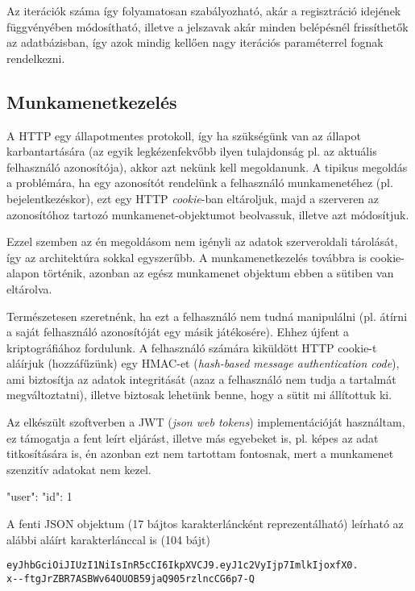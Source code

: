 Az iterációk száma így folyamatosan szabályozható, akár a regisztráció idejének
függvényében módosítható, illetve a jelszavak akár minden belépésnél
frissíthetők az adatbázisban, így azok mindig kellően nagy iterációs
paraméterrel fognak rendelkezni.

\subsection{Munkamenetkezelés}

A HTTP egy állapotmentes protokoll, így ha szükségünk van az állapot
karbantartására (az egyik legkézenfekvőbb ilyen tulajdonság pl. az aktuális
felhasználó azonosítója), akkor azt nekünk kell megoldanunk. A tipikus megoldás
a problémára, ha egy azonosítót rendelünk a felhasználó munkamenetéhez (pl.
bejelentkezéskor), ezt egy HTTP \emph{cookie}-ban eltároljuk, majd a szerveren
az azonosítóhoz tartozó munkamenet-objektumot beolvassuk, illetve azt
módosítjuk.

Ezzel szemben az én megoldásom nem igényli az adatok szerveroldali tárolását,
így az architektúra sokkal egyszerűbb. A munkamenetkezelés továbbra is
cookie-alapon történik, azonban az egész munkamenet objektum ebben a sütiben
van eltárolva.

Természetesen szeretnénk, ha ezt a felhasználó nem tudná manipulálni (pl. átírni
a saját felhasználó azonosítóját egy másik játékosére). Ehhez újfent a
kriptográfiához fordulunk. A felhasználó számára kiküldött HTTP cookie-t
aláírjuk (hozzáfűzünk) egy HMAC-et (\emph{hash-based message authentication
  code}), ami biztosítja az adatok integritását (azaz a felhasználó nem tudja a
tartalmát megváltoztatni), illetve biztosak lehetünk benne, hogy a sütit mi
állítottuk ki.

Az elkészült szoftverben a JWT (\emph{json web tokens}) implementációját
használtam, ez támogatja a fent leírt eljárást, illetve más egyebeket is, pl.
képes az adat titkosítására is, én azonban ezt nem tartottam fontosnak, mert a
munkamenet szenzitív adatokat nem kezel.

\begin{js}
{
  "user": {
    "id": 1
  }
}
\end{js}

A fenti JSON objektum (17 bájtos karakterláncként reprezentálható) leírható az
alábbi aláírt karakterlánccal is (104 bájt)

\begin{verbatim}
eyJhbGciOiJIUzI1NiIsInR5cCI6IkpXVCJ9.eyJ1c2VyIjp7ImlkIjoxfX0.
x--ftgJrZBR7ASBWv64OUOB59jaQ905rzlncCG6p7-Q
\end{verbatim}

